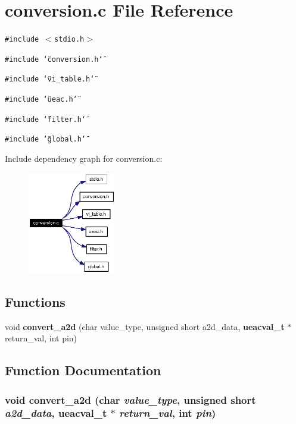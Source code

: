 \section{conversion.c File Reference}
\label{conversion_8c}
{\tt \#include $<$stdio.h$>$}\par
{\tt \#include \char`\"{}conversion.h\char`\"{}}\par
{\tt \#include \char`\"{}vi\_\-table.h\char`\"{}}\par
{\tt \#include \char`\"{}ueac.h\char`\"{}}\par
{\tt \#include \char`\"{}filter.h\char`\"{}}\par
{\tt \#include \char`\"{}global.h\char`\"{}}\par


Include dependency graph for conversion.c:\begin{figure}[H]
\begin{center}
\leavevmode
\includegraphics[width=109pt]{conversion_8c__incl}
\end{center}
\end{figure}
\subsection*{Functions}
\begin{CompactItemize}
\item 
void {\bf convert\_\-a2d} (char value\_\-type, unsigned short a2d\_\-data, {\bf ueacval\_\-t} $\ast$return\_\-val, int pin)
\end{CompactItemize}


\subsection{Function Documentation}
\subsubsection{\setlength{\rightskip}{0pt plus 5cm}void convert\_\-a2d (char {\em value\_\-type}, unsigned short {\em a2d\_\-data}, {\bf ueacval\_\-t} $\ast$ {\em return\_\-val}, int {\em pin})}\label{conversion_8c_a0}




